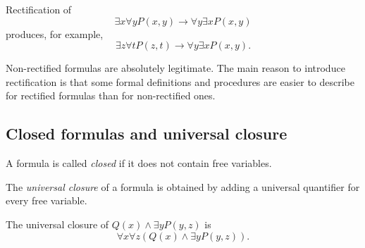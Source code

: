 \begin{page}

\begin{exl}
Rectification of
\[
\exists x \forall y P(x,y) \to \forall y \exists x P(x,y)
\]
produces, for example,
\[
\exists z \forall t P(z,t) \to \forall y \exists x P(x,y).
\]
\end{exl}

\end{page}

\begin{page}

\begin{rem}
Non-rectified formulas are absolutely legitimate.
The main reason to introduce rectification is that
some formal definitions and procedures are easier to describe for rectified formulas than for non-rectified ones.
\end{rem}

\end{page}

\begin{page}

\subsection{Closed formulas and universal closure}

\end{page}

\begin{page}

\begin{dfn}
A formula is called \emph{closed} if it does not contain free variables.
\end{dfn}

\end{page}

\begin{page}

\begin{dfn}
The \emph{universal closure} of a formula is obtained by adding a universal quantifier for every free variable.
\end{dfn}

\end{page}

\begin{page}

\begin{exl}
The universal closure of $Q(x) \wedge \exists y P(y,z)$ is
\[
\forall x \forall z (Q(x) \wedge \exists y P(y,z)).
\]
\end{exl}

\end{page}

